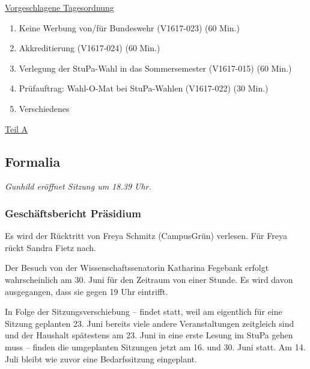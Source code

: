 \documentclass[ngerman,headheight=70pt]{scrartcl}
\begin{document}
    \newpage
    \underline{Vorgeschlagene Tagesordnung}
    \begin{enumerate}[label={\textbf{Top \theenumi}},leftmargin=*]
        \item Keine Werbung von/für Bundeswehr (V1617-023) (60 Min.)
        \item Akkreditierung (V1617-024) (60 Min.)
        \item Verlegung der StuPa-Wahl in das Sommersemester (V1617-015) (60 Min.)
        \item Prüfauftrag: Wahl-O-Mat bei StuPa-Wahlen (V1617-022) (30 Min.)
        \item Verschiedenes
    \end{enumerate}

    \newpage


    {\Large \underline{Teil A}}

    \subsection{Formalia}

    \textit{Gunhild eröffnet Sitzung um 18.39 Uhr.}

    \subsubsection{Geschäftsbericht Präsidium}

    Es wird der Rücktritt von Freya Schmitz (CampusGrün) verlesen. Für Freya
    rückt Sandra Fietz nach.

    Der Besuch von der Wissenschaftssenatorin Katharina Fegebank erfolgt
    wahrscheinlich am 30. Juni für den Zeitraum von einer Stunde. Es wird davon
    ausgegangen, dass sie gegen 19 Uhr eintrifft.

    In Folge der Sitzungsverschiebung -- findet statt, weil am eigentlich
    für eine Sitzung geplanten 23. Juni bereits viele andere Veranstaltungen
    zeitgleich sind und der Haushalt spätestens am 23. Juni in eine erste
    Lesung im StuPa gehen muss -- finden die umgeplanten Sitzungen jetzt am
    16. und 30. Juni statt. Am 14. Juli bleibt wie zuvor eine Bedarfssitzung
    eingeplant.
\end{document}
